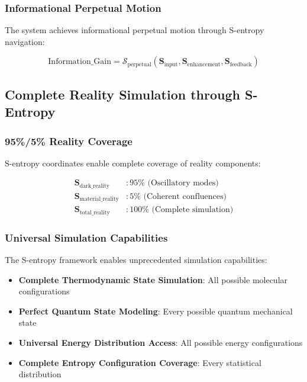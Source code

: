 \documentclass[12pt,a4paper]{article}
\begin{document}
{\subsubsection{Informational Perpetual Motion}

The system achieves informational perpetual motion through S-entropy navigation:

\begin{equation}
\text{Information\_Gain} = \mathcal{S}_{\text{perpetual}}(\mathbf{S}_{\text{input}}, \mathbf{S}_{\text{enhancement}}, \mathbf{S}_{\text{feedback}})
\end{equation}

\subsection{Complete Reality Simulation through S-Entropy}

\subsubsection{95\%/5\% Reality Coverage}

S-entropy coordinates enable complete coverage of reality components:

\begin{align}
\mathbf{S}_{\text{dark\_reality}} &: 95\% \text{ (Oscillatory modes)} \\
\mathbf{S}_{\text{material\_reality}} &: 5\% \text{ (Coherent confluences)} \\
\mathbf{S}_{\text{total\_reality}} &: 100\% \text{ (Complete simulation)}
\end{align}

\subsubsection{Universal Simulation Capabilities}

The S-entropy framework enables unprecedented simulation capabilities:

\begin{itemize}
\item \textbf{Complete Thermodynamic State Simulation}: All possible molecular configurations
\item \textbf{Perfect Quantum State Modeling}: Every possible quantum mechanical state
\item \textbf{Universal Energy Distribution Access}: All possible energy configurations
\item \textbf{Complete Entropy Configuration Coverage}: Every statistical distribution
\end{itemize}

}
\end{document}
